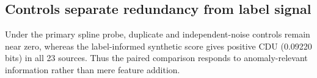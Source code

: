 \subsection{Controls separate redundancy from label signal}
Under the primary spline probe, duplicate and independent-noise controls remain near zero, whereas the label-informed synthetic score gives positive CDU (0.09220 bits) in all 23 sources. Thus the paired comparison responds to anomaly-relevant information rather than mere feature addition.
